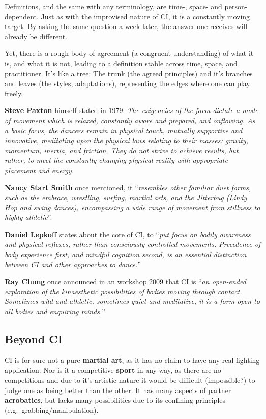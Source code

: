 Definitions, and the same with any terminology, are time-, space- and person-dependent.
Just as with the improvised nature of CI, it is a constantly moving target.
By asking the same question a week later, the answer one receives will already be different.

Yet, there is a rough body of agreement (a congruent understanding) of what it is, and what it is not, leading to a definition stable across time, space, and practitioner.
It's like a tree: The trunk (the agreed principles) and it's branches and leaves (the styles, adaptations), representing the edges where one can play freely.

\textbf{Steve Paxton} himself stated in 1979: \textit{The exigencies of the form dictate a mode of movement which is relaxed, constantly aware and prepared, and onflowing. As a basic focus, the dancers remain in physical touch, mutually supportive and innovative, meditating upon the physical laws relating to their masses: gravity, momentum, inertia, and friction. They do not strive to achieve results, but rather, to meet the constantly changing physical reality with appropriate placement and energy.}

\textbf{Nancy Start Smith} once mentioned, it ``\textit{resembles other familiar duet forms, such as the embrace, wrestling, surfing, martial arts, and the Jitterbug (Lindy Hop and swing dances), encompassing a wide range of movement from stillness to highly athletic}''.

\textbf{Daniel Lepkoff} states about the core of CI, to ``\textit{put focus on bodily awareness and physical reflexes, rather than consciously controlled movements. Precedence of body experience first, and mindful cognition second, is an essential distinction between CI and other approaches to dance.}''

\textbf{Ray Chung} once announced in an workshop 2009 that CI is ``\textit{an open-ended exploration of the kinaesthetic possibilities of bodies moving through contact. Sometimes wild and athletic, sometimes quiet and meditative, it is a form open to all bodies and enquiring minds.}''

\subsection{Beyond CI}\label{subsec:beyond-ci}

CI is for sure not a pure \textbf{martial art}, as it has no claim to have any real fighting application.
Nor is it a competitive \textbf{sport} in any way, as there are no competitions and due to it's artistic nature it would be difficult (impossible?) to judge one as being better than the other.
It has many aspects of partner \textbf{acrobatics}, but lacks many possibilities due to its confining principles (e.g.\ grabbing/manipulation).

